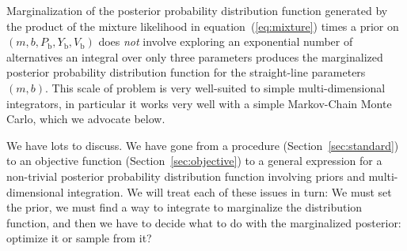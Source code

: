 \documentclass[12pt,twoside]{article}
\newcommand{\sectionname}{Section}
\newcommand{\equationname}{equation}
\newcounter{problem}
\newcommand{\Pbad}{P_{\mathrm{b}}}
\newcommand{\Ybad}{Y_{\mathrm{b}}}
\newcommand{\Vbad}{V_{\mathrm{b}}}
\begin{document}
Marginalization of the posterior probability distribution function
generated by the product of the mixture likelihood in
\equationname~(\ref{eq:mixture}) times a prior on
$(m,b,\Pbad,\Ybad,\Vbad)$ does \emph{not} involve exploring an
exponential number of alternatives an integral over only three
parameters produces the marginalized posterior probability
distribution function for the straight-line parameters $(m,b)$.  This
scale of problem is very well-suited to simple multi-dimensional
integrators, in particular it works very well with a simple
Markov-Chain Monte Carlo, which we advocate below.

We have lots to discuss.  We have gone from a procedure
(\sectionname~\ref{sec:standard}) to an objective function
(\sectionname~\ref{sec:objective}) to a general expression for a
non-trivial posterior probability distribution function involving
priors and multi-dimensional integration.  We will treat each of
these issues in turn: We must set the prior, we must find a way to
integrate to marginalize the distribution function, and then we have
to decide what to do with the marginalized posterior: optimize it or
sample from it?
\end{document}
